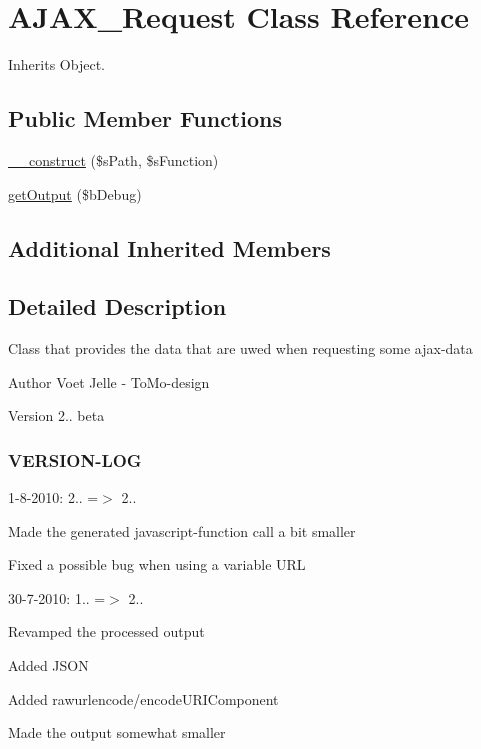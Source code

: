 \hypertarget{class_a_j_a_x___request}{\section{A\-J\-A\-X\-\_\-\-Request Class Reference}
\label{class_a_j_a_x___request}
}


Inherits Object.

\subsection*{Public Member Functions}
\begin{DoxyCompactItemize}
\item 
\hyperlink{class_a_j_a_x___request_af52fb2396a94ebf19dd21d3d619c1f72}{\-\_\-\-\_\-construct} (\$s\-Path, \$s\-Function)
\item 
\hyperlink{class_a_j_a_x___request_ae3d7238e5ffb444784b47be69a9e740a}{get\-Output} (\$b\-Debug)
\end{DoxyCompactItemize}
\subsection*{Additional Inherited Members}


\subsection{Detailed Description}
Class that provides the data that are uwed when requesting some ajax-\/data

\begin{DoxyAuthor}{Author}
Voet Jelle -\/ To\-Mo-\/design 
\end{DoxyAuthor}
\begin{DoxyVersion}{Version}
2.. beta
\end{DoxyVersion}
\subsubsection*{V\-E\-R\-S\-I\-O\-N-\/\-L\-O\-G }

1-\/8-\/2010\-: 2.. =$>$ 2..
\begin{DoxyItemize}
\item Made the generated javascript-\/function call a bit smaller
\item Fixed a possible bug when using a variable U\-R\-L
\end{DoxyItemize}

30-\/7-\/2010\-: 1.. =$>$ 2..
\begin{DoxyItemize}
\item Revamped the processed output
\item Added J\-S\-O\-N
\item Added rawurlencode/encode\-U\-R\-I\-Component
\item Made the output somewhat smaller 
\end{DoxyItemize}

